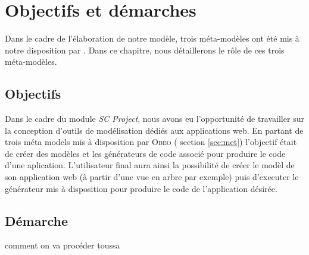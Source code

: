 \chapter{Objectifs et démarches}\label{chap:mod}
Dans le cadre de l'élaboration de notre modèle, trois méta-modèles ont été mis à notre disposition par \obeo. Dans ce chapitre, nous détaillerons le rôle de ces trois méta-modèles.


\section{Objectifs}
Dans le cadre du module \emph{SC Project}, nous avons eu l'opportunité de travailler sur la conception d'outils de modélisation dédiés aux applications web. En partant de trois méta models mis à disposition par \textsc{Obeo}
(\cf{} section \ref{sec:met}) l'objectif était de créer des modèles et les générateurs de code associé pour produire le code d'une aplication. L'utilisateur final aura ainsi la possibilité de créer le modèl de son application web (à partir d'une vue en arbre par exemple) puis d'executer le générateur mis à disposition pour produire le code de l'application désirée.





\section{Démarche}
comment on va procéder toussa

